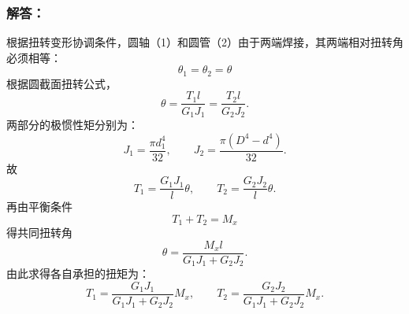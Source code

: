 \documentclass[11pt,a4paper]{ctexrep}
\begin{document}
{\subsubsection*{解答：}

根据扭转变形协调条件，圆轴（1）和圆管（2）由于两端焊接，其两端相对扭转角必须相等：
\[
    \theta_1 = \theta_2 = \theta
\]
根据圆截面扭转公式，
\[
    \theta=\frac{T_1l}{G_1J_1}=\frac{T_2l}{G_2J_2}.
\]
两部分的极惯性矩分别为：
\[
    J_1=\frac{\pi d_1^4}{32},\qquad
    J_2=\frac{\pi(D^4-d^4)}{32}.
\]
故
\[
    T_1=\frac{G_1J_1}{l}\theta,\qquad
    T_2=\frac{G_2J_2}{l}\theta.
\]
再由平衡条件
\[
    T_1+T_2=M_x
\]
得共同扭转角
\[
    \theta=\frac{M_xl}{G_1J_1+G_2J_2}.
\]
由此求得各自承担的扭矩为：
\[
    T_1=\frac{G_1J_1}{G_1J_1+G_2J_2}M_x,\qquad
    T_2=\frac{G_2J_2}{G_1J_1+G_2J_2}M_x.
\]


}
\end{document}
